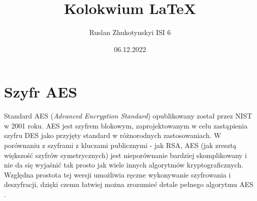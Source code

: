 \documentclass[12pt, letterpaper, titlepage]{article}
\title{Kolokwium LaTeX}
\author{Ruslan Zhukotynskyi ISI 6}
\date{06.12.2022}
\begin{document}
\maketitle
\section{Szyfr AES}
Standard AES (\textit{Advanced Encryption Standard}) opublikowany został przez NIST w 2001
roku. AES jest szyfrem blokowym, zaprojektowanym w celu zastąpienia szyfru DES jako
przyjęty standard w różnorodnych zastosowaniach. W porównaniu z szyframi z kluczami
publicznymi - jak RSA, AES (jak zresztą większość szyfrów symetrycznych) jest nieporównanie
bardziej skomplikowany i nie da się wyjaśnić tak prosto jak wiele innych algorytmów
kryptograficznych. Względna prostota tej wersji umożliwia ręczne wykonywanie szyfrowania
i deszyfracji, dzięki czemu łatwiej można zrozumieć detale pełnego algorytmu AES \cite{text1}.
\end{document}
